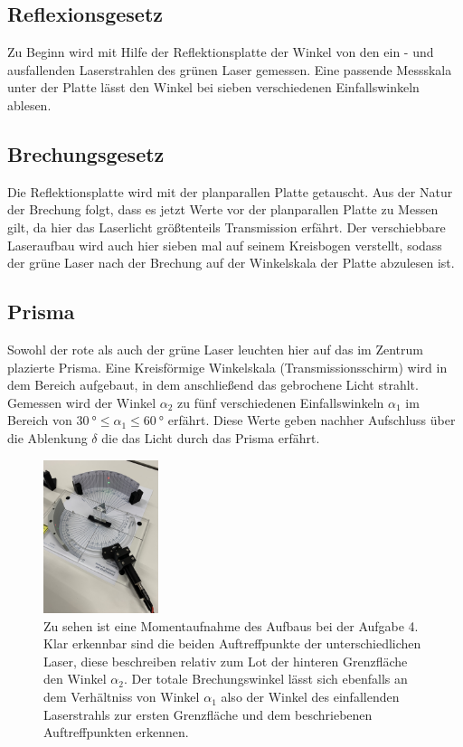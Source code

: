 \subsection{Reflexionsgesetz}
Zu Beginn wird mit Hilfe der Reflektionsplatte der Winkel von den ein - und ausfallenden Laserstrahlen des grünen Laser gemessen. 
Eine passende Messskala unter der Platte lässt den Winkel bei sieben verschiedenen Einfallswinkeln ablesen.

\subsection{Brechungsgesetz}
Die Reflektionsplatte wird mit der planparallen Platte getauscht. Aus der Natur der Brechung folgt, dass es jetzt Werte 
vor der planparallen Platte zu Messen gilt, da hier das Laserlicht größtenteils Transmission erfährt.
Der verschiebbare Laseraufbau wird auch hier sieben mal auf seinem Kreisbogen verstellt, sodass der grüne Laser 
nach der Brechung auf der Winkelskala der Platte abzulesen ist. 

\subsection{Prisma}

Sowohl der rote als auch der grüne Laser leuchten hier auf das im Zentrum plazierte Prisma.
Eine Kreisförmige Winkelskala (Transmissionsschirm) wird in dem Bereich aufgebaut, in dem anschließend das gebrochene Licht strahlt. Gemessen wird der Winkel $\alpha_2$ zu fünf verschiedenen Einfallswinkeln $\alpha_1$ im Bereich von 
$\SI{30}{\degree} \leq \alpha_1 \leq \SI{60}{\degree}$ erfährt. Diese Werte geben nachher Aufschluss
über die Ablenkung $\delta$ die das Licht durch das Prisma erfährt.
    \begin{figure}
        \centering
        \includegraphics[width=0.3\textwidth]{bilder/prisma.jpg}
        \caption{Zu sehen ist eine Momentaufnahme des Aufbaus bei der Aufgabe 4. \cite{skript} 
        Klar erkennbar sind die beiden Auftreffpunkte der unterschiedlichen Laser, diese beschreiben relativ zum Lot der hinteren Grenzfläche den Winkel $\alpha_2$. Der totale Brechungswinkel lässt sich ebenfalls an dem Verhältniss von Winkel $\alpha_1$ also der Winkel des einfallenden Laserstrahls zur ersten Grenzfläche und dem beschriebenen Auftreffpunkten erkennen.}
\end{figure}
\newpage
